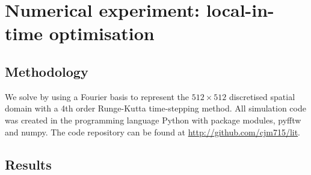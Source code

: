 \documentclass[12pt]{iopart}
\begin{document}
%
\section{Numerical experiment: local-in-time optimisation}
\label{sec:numerical_experiment}
\subsection{Methodology}

We solve  by using a Fourier basis to represent the $512 \times 512$ discretised spatial domain with a 4th order Runge-Kutta time-stepping method. All simulation code was created in the programming language Python with package modules, pyfftw and numpy. The code repository can be found at \href{http://github.com/cjm715/lit}{ http://github.com/cjm715/lit}.




\subsection{Results}
\end{document}
